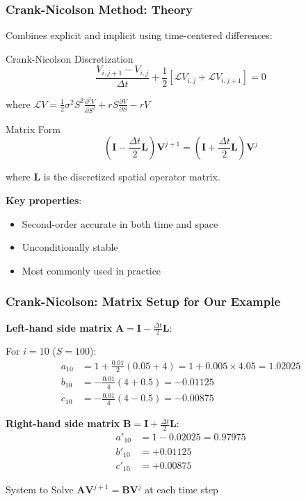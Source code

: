 \documentclass[aspectratio=169]{beamer}
\begin{document}
\begin{frame}
\frametitle{Crank-Nicolson Method: Theory}
Combines explicit and implicit using time-centered differences:

\begin{block}{Crank-Nicolson Discretization}
\[\frac{V_{i,j+1} - V_{i,j}}{\Delta t} + \frac{1}{2}\left[ \mathcal{L}V_{i,j} + \mathcal{L}V_{i,j+1} \right] = 0\]

where \(\mathcal{L}V = \frac{1}{2}\sigma^2 S^2 \frac{\partial^2 V}{\partial S^2} + rS \frac{\partial V}{\partial S} - rV\)
\end{block}

\begin{block}{Matrix Form}
\[\left( \mathbf{I} - \frac{\Delta t}{2}\mathbf{L} \right) \mathbf{V}^{j+1} = \left( \mathbf{I} + \frac{\Delta t}{2}\mathbf{L} \right) \mathbf{V}^j\]

where \(\mathbf{L}\) is the discretized spatial operator matrix.
\end{block}

\textbf{Key properties}:
\begin{itemize}
\item Second-order accurate in both time and space
\item Unconditionally stable
\item Most commonly used in practice
\end{itemize}
\end{frame}

\begin{frame}
\frametitle{Crank-Nicolson: Matrix Setup for Our Example}
\textbf{Left-hand side matrix} \(\mathbf{A} = \mathbf{I} - \frac{\Delta t}{2}\mathbf{L}\):

For \(i = 10\) (\(S = 100\)):
\begin{align}
a_{10} &= 1 + \frac{0.01}{2}(0.05 + 4) = 1 + 0.005 \times 4.05 = 1.02025 \\
b_{10} &= -\frac{0.01}{4}(4 + 0.5) = -0.01125 \\
c_{10} &= -\frac{0.01}{4}(4 - 0.5) = -0.00875
\end{align}

\textbf{Right-hand side matrix} \(\mathbf{B} = \mathbf{I} + \frac{\Delta t}{2}\mathbf{L}\):
\begin{align}
a'_{10} &= 1 - 0.02025 = 0.97975 \\
b'_{10} &= +0.01125 \\
c'_{10} &= +0.00875
\end{align}

\begin{block}{System to Solve}
\(\mathbf{A} \mathbf{V}^{j+1} = \mathbf{B} \mathbf{V}^j\) at each time step
\end{block}
\end{frame}
\end{document}
